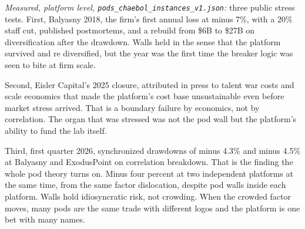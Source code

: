 \textit{Measured, platform level, \texttt{pods\_chaebol\_instances\_v1.json}:} three public stress tests. First, Balyasny 2018, the firm's first annual loss at minus 7\%, with a 20\% staff cut, published postmortems, and a rebuild from \$6B to \$27B on diversification after the drawdown. Walls held in the sense that the platform survived and re diversified, but the year was the first time the breaker logic was seen to bite at firm scale.

Second, Eisler Capital's 2025 closure, attributed in press to talent war costs and scale economics that made the platform's cost base unsustainable even before market stress arrived. That is a boundary failure by economics, not by correlation. The organ that was stressed was not the pod wall but the platform's ability to fund the lab itself.

Third, first quarter 2026, synchronized drawdowns of minus 4.3\% and minus 4.5\% at Balyasny and ExodusPoint on correlation breakdown. That is the finding the whole pod theory turns on. Minus four percent at two independent platforms at the same time, from the same factor dislocation, despite pod walls inside each platform. Walls hold idiosyncratic risk, not crowding. When the crowded factor moves, many pods are the same trade with different logos and the platform is one bet with many names.

